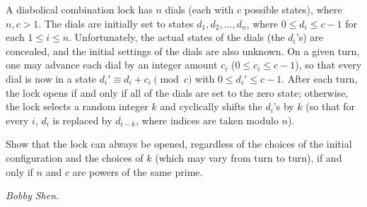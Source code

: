 A diabolical combination lock has $n$ dials (each with $c$ possible states), where $n,c>1$. The dials are initially set to states $d_1, d_2, \ldots, d_n$, where $0\le d_i\le c-1$ for each $1\le i\le n$. Unfortunately, the actual states of the dials (the $d_i$'s) are concealed, and the initial settings of the dials are also unknown. On a given turn, one may advance each dial by an integer amount $c_i$ ($0\le c_i\le c-1$), so that every dial is now in a state $d_i '\equiv d_i+c_i \pmod{c}$ with $0\le d_i ' \le c-1$. After each turn, the lock opens if and only if all of the dials are set to the zero state; otherwise, the lock selects a random integer $k$ and cyclically shifts the $d_i$'s by $k$ (so that for every $i$, $d_i$ is replaced by $d_{i-k}$, where indices are taken modulo $n$).

Show that the lock can always be opened, regardless of the choices of the initial configuration and the choices of $k$ (which may vary from turn to turn), if and only if $n$ and $c$ are powers of the same prime.

\textit{Bobby Shen.}